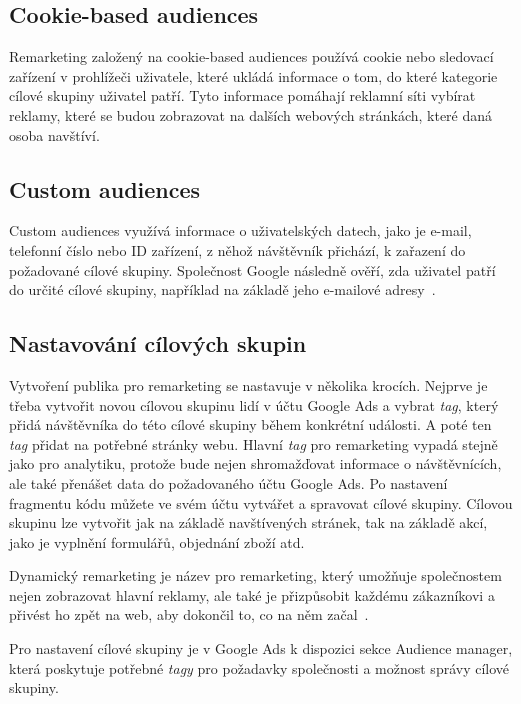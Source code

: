 \subsection*{Cookie-based audiences}
Remarketing založený na cookie-based audiences používá cookie nebo sledovací zařízení v prohlížeči uživatele, které ukládá informace o tom, do které kategorie cílové skupiny uživatel patří. Tyto informace pomáhají reklamní síti vybírat reklamy, které se budou zobrazovat na dalších webových stránkách, které daná osoba navštíví.

\subsection*{Custom audiences}
Custom audiences využívá informace o uživatelských datech, jako je e-mail, telefonní číslo nebo ID zařízení, z něhož návštěvník přichází, k zařazení do požadované cílové skupiny. Společnost Google následně ověří, zda uživatel patří do určité cílové skupiny, například na základě jeho e-mailové adresy~\cite{googleAds}. 

\subsection*{Nastavování cílových skupin}
Vytvoření publika pro remarketing se nastavuje v několika krocích. Nejprve je třeba vytvořit novou cílovou skupinu lidí v účtu Google Ads a vybrat {\it tag}, který přidá návštěvníka do této cílové skupiny během konkrétní události.  A poté ten {\it tag} přidat na potřebné stránky webu. Hlavní {\it tag} pro remarketing vypadá stejně jako pro analytiku, protože bude nejen shromažďovat informace o návštěvnících, ale také přenášet data do požadovaného účtu Google Ads. Po nastavení fragmentu kódu můžete ve svém účtu vytvářet a spravovat cílové skupiny. Cílovou skupinu lze vytvořit jak na základě navštívených stránek, tak na základě akcí, jako je vyplnění formulářů, objednání zboží atd.

Dynamický remarketing je název pro remarketing, který umožňuje společnostem nejen zobrazovat hlavní reklamy, ale také je přizpůsobit každému zákazníkovi a přivést ho zpět na web, aby dokončil to, co na něm začal~\cite{dynRemarket}.

Pro nastavení cílové skupiny je v Google Ads k dispozici sekce Audience manager, která poskytuje potřebné {\it tagy} pro požadavky společnosti a možnost správy cílové skupiny. 


